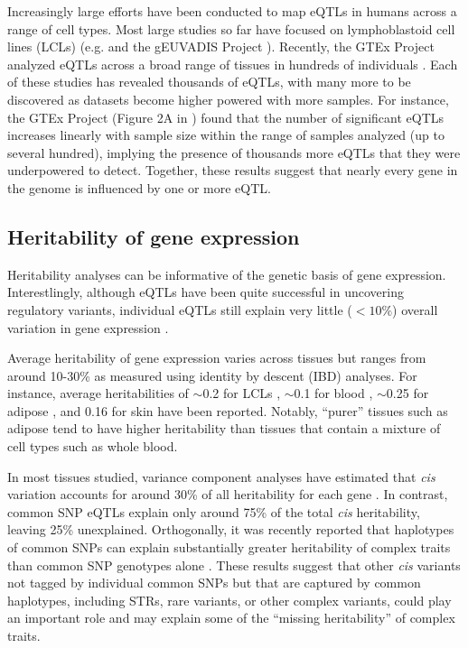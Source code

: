 Increasingly large efforts have been conducted to map eQTLs in humans across a range of cell types. Most large studies so far have focused on lymphoblastoid cell lines (LCLs) (e.g. \cite{GaffneyVeyrierasDegnerEtAl2012} and the gEUVADIS Project \cite{LappalainenSammethFriedlanderEtAl2013}). Recently, the GTEx Project analyzed eQTLs across a broad range of tissues in hundreds of individuals \cite{ArdlieDelucaSegreEtAl2015}. Each of these studies has revealed thousands of eQTLs, with many more to be discovered as datasets become higher powered with more samples. For instance, the GTEx Project (Figure 2A in \cite{ArdlieDelucaSegreEtAl2015}) found that the number of significant eQTLs increases linearly with sample size within the range of samples analyzed (up to several hundred), implying the presence of thousands more eQTLs that they were underpowered to detect. Together, these results suggest that nearly every gene in the genome is influenced by one or more eQTL.

\subsection{Heritability of gene expression}
Heritability analyses can be informative of the genetic basis of gene expression. Interestlingly, although eQTLs have been quite successful in uncovering regulatory variants, individual eQTLs still explain very little ($< 10\%$) overall variation in gene expression \cite{GrundbergSmallHedmanEtAl2012}. 

Average heritability of gene expression varies across tissues but ranges from around 10-30\% as measured using identity by descent (IBD) analyses. For instance, average heritabilities of $\sim$0.2 for LCLs \cite{GrundbergSmallHedmanEtAl2012,DixonLiangMoffattEtAl2007}, $\sim$0.1 for blood \cite{PriceHelgasonThorleifssonEtAl2011,WrightSullivanBrooksEtAl2014}, $\sim$0.25 for adipose \cite{PriceHelgasonThorleifssonEtAl2011,GrundbergSmallHedmanEtAl2012}, and 0.16 for skin \cite{GrundbergSmallHedmanEtAl2012} have been reported. Notably, ``purer'' tissues such as adipose tend to have higher heritability than tissues that contain a mixture of cell types such as whole blood.

In most tissues studied, variance component analyses have estimated that \emph{cis} variation accounts for around 30\% of all heritability for each gene \cite{GrundbergSmallHedmanEtAl2012,PriceHelgasonThorleifssonEtAl2011}. In contrast, common SNP eQTLs explain only around 75\% of the total \emph{cis} heritability, leaving 25\% unexplained.  Orthogonally, it was recently reported that haplotypes of common SNPs can explain substantially greater heritability of complex traits than common SNP genotypes alone \cite{BhatiaGusevLohEtAl2015}. These results suggest that other \emph{cis} variants not tagged by individual common SNPs but that are captured by common haplotypes, including STRs, rare variants, or other complex variants, could play an important role and may explain some of the ``missing heritability'' of complex traits. 

